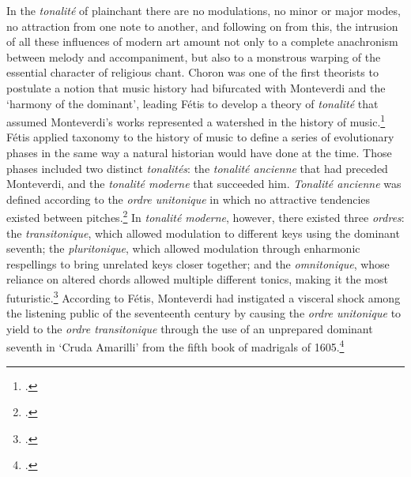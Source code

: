   {\cites[409]{Danjouaccompagnementplainchant1847}[Reproduced in][col.~25]{DOrtigueDictionnaireplainchantmusique1854}[See also][200]{LessmannRezeptiongregorianischenChorals2016}}
{In the \emph{tonalité} of plainchant there are no modulations, no minor or major modes, no attraction from one note to another, and following on from this, the intrusion of all these influences of modern art amount not only to a complete anachronism between melody and accompaniment, but also to a monstrous warping of the essential character of religious chant.}
\noindent
Choron was one of the first theorists to postulate a notion that music history had bifurcated with Monteverdi and the `harmony of the dominant', leading Fétis to develop a theory of \emph{tonalité} that assumed Monteverdi's works represented a watershed in the history of music.\footcite[p.~xxxix]{ChoronDictionnairehistoriquemusiciens1810}
\label{sc:fetis_inconsistent}%
Fétis applied taxonomy to the history of music to define a series of evolutionary phases in the same way a natural historian would have done at the time.
Those phases included two distinct \emph{tonalités}: the \textit{tonalité ancienne} that had preceded Monteverdi, and the \textit{tonalité moderne} that succeeded him.
\emph{Tonalité ancienne} was defined according to the \emph{ordre unitonique} in which no attractive tendencies existed between pitches.\footcite[20]{ChristensenStoriesTonalityAge2019}
In \emph{tonalité moderne}, however, there existed three \emph{ordres}: the \textit{transitonique}, which allowed modulation to different keys using the dominant seventh; the \emph{pluritonique}, which allowed modulation through enharmonic respellings to bring unrelated keys closer together; and the \emph{omnitonique}, whose reliance on altered chords allowed multiple different tonics, making it the most futuristic.\footcite[127--32]{SimmsChoronFetisTheory1975}
According to Fétis, Monteverdi had instigated a visceral shock among the listening public of the seventeenth century by causing the \emph{ordre unitonique} to yield to the \emph{ordre transitonique} through the use of an unprepared dominant seventh in `Cruda Amarilli' from the fifth book of madrigals of 1605.\footcites[pp.~xliii, 250]{FetisTraitecomplettheorie1867}[14]{Dahlhaustonaliteharmoniqueetude1993}

